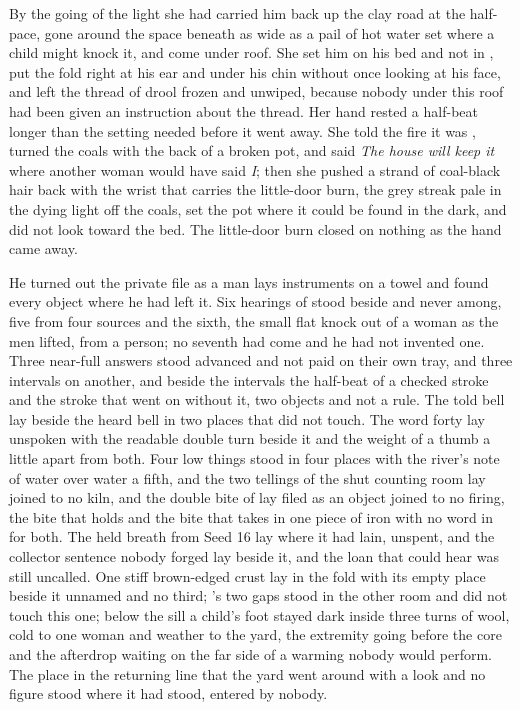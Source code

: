 By the going of the light she had carried him back up the clay road at the half-pace, gone around the space beneath  as wide as a pail of hot water set where a child might knock it, and come under  roof. She set him on his bed and not in , put the fold right at his ear and under his chin without once looking at his face, and left the thread of drool frozen and unwiped, because nobody under this roof had been given an instruction about the thread. Her hand rested a half-beat longer than the setting needed before it went away. She told the fire it was , turned the coals with the back of a broken pot, and said \emph{The house will keep it} where another woman would have said \emph{I}; then she pushed a strand of coal-black hair back with the wrist that carries the little-door burn, the grey streak pale in the dying light off the coals, set the pot where it could be found in the dark, and did not look toward the bed. The little-door burn closed on nothing as the hand came away.

He turned out the private file as a man lays instruments on a towel and found every object where he had left it. Six hearings of  stood beside and never among, five from four sources and the sixth, the small flat knock out of a woman as the men lifted, from a person; no seventh had come and he had not invented one. Three near-full answers stood advanced and not paid on their own tray, and three intervals on another, and beside the intervals the half-beat of a checked stroke and the stroke that went on without it, two objects and not a rule. The told bell lay beside the heard bell in two places that did not touch. The word forty lay unspoken with the readable double turn beside it and the weight of a thumb a little apart from both. Four low things stood in four places with the river's note of water over water a fifth, and the two tellings of the shut counting room lay joined to no kiln, and the double bite of  lay filed as an object joined to no firing, the bite that holds and the bite that takes in one piece of iron with no word in  for both. The held breath from Seed 16 lay where it had lain, unspent, and the collector sentence nobody forged lay beside it, and the loan that could hear was still uncalled. One stiff brown-edged crust lay in the fold with its empty place beside it unnamed and no third; 's two gaps stood in the other room and did not touch this one; below the sill a child's foot stayed dark inside three turns of wool, cold to one woman and weather to the yard, the extremity going before the core and the afterdrop waiting on the far side of a warming nobody would perform. The place in the returning line that the yard went around with a look and no figure stood where it had stood, entered by nobody.

